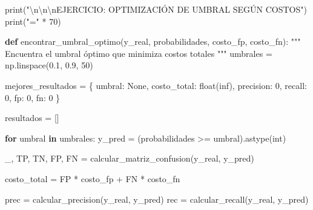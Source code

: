 \documentclass[
  doc,
  floatsintext,
  longtable,
  a4paper,
  nolmodern,
  notxfonts,
  notimes,
  12pt,
  colorlinks=true,linkcolor=blue,citecolor=blue,urlcolor=blue]{apa7}
\newenvironment{Shaded}{\begin{snugshade}}{\end{snugshade}}
\newcommand{\BuiltInTok}[1]{\textcolor[rgb]{0.00,0.23,0.31}{#1}}
\newcommand{\CharTok}[1]{\textcolor[rgb]{0.13,0.47,0.30}{#1}}
\newcommand{\CommentTok}[1]{\textcolor[rgb]{0.37,0.37,0.37}{#1}}
\newcommand{\ControlFlowTok}[1]{\textcolor[rgb]{0.00,0.23,0.31}{\textbf{#1}}}
\newcommand{\DecValTok}[1]{\textcolor[rgb]{0.68,0.00,0.00}{#1}}
\newcommand{\FloatTok}[1]{\textcolor[rgb]{0.68,0.00,0.00}{#1}}
\newcommand{\KeywordTok}[1]{\textcolor[rgb]{0.00,0.23,0.31}{\textbf{#1}}}
\newcommand{\NormalTok}[1]{\textcolor[rgb]{0.00,0.23,0.31}{#1}}
\newcommand{\OperatorTok}[1]{\textcolor[rgb]{0.37,0.37,0.37}{#1}}
\newcommand{\StringTok}[1]{\textcolor[rgb]{0.13,0.47,0.30}{#1}}
\newcommand{\VariableTok}[1]{\textcolor[rgb]{0.07,0.07,0.07}{#1}}
\begin{document}
\begin{Shaded}
\begin{Highlighting}[]
\BuiltInTok{print}\NormalTok{(}\StringTok{"}\CharTok{\textbackslash{}n\textbackslash{}n\textbackslash{}n}\StringTok{EJERCICIO: OPTIMIZACIÓN DE UMBRAL SEGÚN COSTOS"}\NormalTok{)}
\BuiltInTok{print}\NormalTok{(}\StringTok{"="} \OperatorTok{*} \DecValTok{70}\NormalTok{)}

\KeywordTok{def}\NormalTok{ encontrar\_umbral\_optimo(y\_real, probabilidades, costo\_fp, costo\_fn):}
    \CommentTok{"""}
\CommentTok{    Encuentra el umbral óptimo que minimiza costos totales}
\CommentTok{    """}
\NormalTok{    umbrales }\OperatorTok{=}\NormalTok{ np.linspace(}\FloatTok{0.1}\NormalTok{, }\FloatTok{0.9}\NormalTok{, }\DecValTok{50}\NormalTok{)}
    
\NormalTok{    mejores\_resultados }\OperatorTok{=}\NormalTok{ \{}
        \StringTok{\textquotesingle{}umbral\textquotesingle{}}\NormalTok{: }\VariableTok{None}\NormalTok{,}
        \StringTok{\textquotesingle{}costo\_total\textquotesingle{}}\NormalTok{: }\BuiltInTok{float}\NormalTok{(}\StringTok{\textquotesingle{}inf\textquotesingle{}}\NormalTok{),}
        \StringTok{\textquotesingle{}precision\textquotesingle{}}\NormalTok{: }\DecValTok{0}\NormalTok{,}
        \StringTok{\textquotesingle{}recall\textquotesingle{}}\NormalTok{: }\DecValTok{0}\NormalTok{,}
        \StringTok{\textquotesingle{}fp\textquotesingle{}}\NormalTok{: }\DecValTok{0}\NormalTok{,}
        \StringTok{\textquotesingle{}fn\textquotesingle{}}\NormalTok{: }\DecValTok{0}
\NormalTok{    \}}
    
\NormalTok{    resultados }\OperatorTok{=}\NormalTok{ []}
    
    \ControlFlowTok{for}\NormalTok{ umbral }\KeywordTok{in}\NormalTok{ umbrales:}
\NormalTok{        y\_pred }\OperatorTok{=}\NormalTok{ (probabilidades }\OperatorTok{\textgreater{}=}\NormalTok{ umbral).astype(}\BuiltInTok{int}\NormalTok{)}
        
\NormalTok{        \_, TP, TN, FP, FN }\OperatorTok{=}\NormalTok{ calcular\_matriz\_confusion(y\_real, y\_pred)}
        
\NormalTok{        costo\_total }\OperatorTok{=}\NormalTok{ FP }\OperatorTok{*}\NormalTok{ costo\_fp }\OperatorTok{+}\NormalTok{ FN }\OperatorTok{*}\NormalTok{ costo\_fn}
        
\NormalTok{        prec }\OperatorTok{=}\NormalTok{ calcular\_precision(y\_real, y\_pred)}
\NormalTok{        rec }\OperatorTok{=}\NormalTok{ calcular\_recall(y\_real, y\_pred)}
        

\end{Highlighting}
\end{Shaded}
\end{document}
